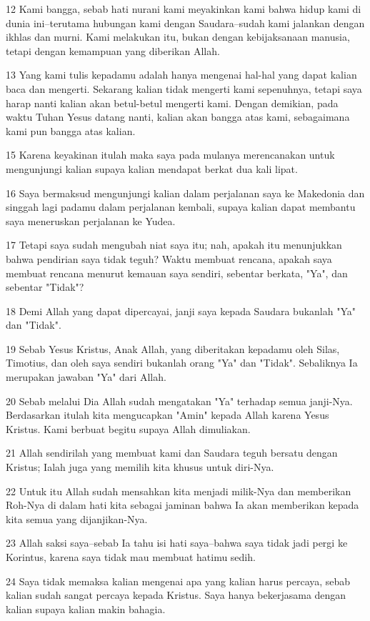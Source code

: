 \par 12 Kami bangga, sebab hati nurani kami meyakinkan kami bahwa hidup kami di dunia ini--terutama hubungan kami dengan Saudara--sudah kami jalankan dengan ikhlas dan murni. Kami melakukan itu, bukan dengan kebijaksanaan manusia, tetapi dengan kemampuan yang diberikan Allah.
\par 13 Yang kami tulis kepadamu adalah hanya mengenai hal-hal yang dapat kalian baca dan mengerti. Sekarang kalian tidak mengerti kami sepenuhnya, tetapi saya harap nanti kalian akan betul-betul mengerti kami. Dengan demikian, pada waktu Tuhan Yesus datang nanti, kalian akan bangga atas kami, sebagaimana kami pun bangga atas kalian.
\par 15 Karena keyakinan itulah maka saya pada mulanya merencanakan untuk mengunjungi kalian supaya kalian mendapat berkat dua kali lipat.
\par 16 Saya bermaksud mengunjungi kalian dalam perjalanan saya ke Makedonia dan singgah lagi padamu dalam perjalanan kembali, supaya kalian dapat membantu saya meneruskan perjalanan ke Yudea.
\par 17 Tetapi saya sudah mengubah niat saya itu; nah, apakah itu menunjukkan bahwa pendirian saya tidak teguh? Waktu membuat rencana, apakah saya membuat rencana menurut kemauan saya sendiri, sebentar berkata, "Ya", dan sebentar "Tidak"?
\par 18 Demi Allah yang dapat dipercayai, janji saya kepada Saudara bukanlah "Ya" dan "Tidak".
\par 19 Sebab Yesus Kristus, Anak Allah, yang diberitakan kepadamu oleh Silas, Timotius, dan oleh saya sendiri bukanlah orang "Ya" dan "Tidak". Sebaliknya Ia merupakan jawaban "Ya" dari Allah.
\par 20 Sebab melalui Dia Allah sudah mengatakan "Ya" terhadap semua janji-Nya. Berdasarkan itulah kita mengucapkan "Amin" kepada Allah karena Yesus Kristus. Kami berbuat begitu supaya Allah dimuliakan.
\par 21 Allah sendirilah yang membuat kami dan Saudara teguh bersatu dengan Kristus; Ialah juga yang memilih kita khusus untuk diri-Nya.
\par 22 Untuk itu Allah sudah mensahkan kita menjadi milik-Nya dan memberikan Roh-Nya di dalam hati kita sebagai jaminan bahwa Ia akan memberikan kepada kita semua yang dijanjikan-Nya.
\par 23 Allah saksi saya--sebab Ia tahu isi hati saya--bahwa saya tidak jadi pergi ke Korintus, karena saya tidak mau membuat hatimu sedih.
\par 24 Saya tidak memaksa kalian mengenai apa yang kalian harus percaya, sebab kalian sudah sangat percaya kepada Kristus. Saya hanya bekerjasama dengan kalian supaya kalian makin bahagia.

